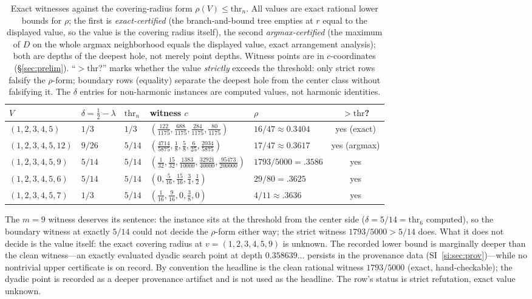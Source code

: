 \documentclass[11pt,a4paper]{article}
\numberwithin{equation}{section}
\theoremstyle{plain}
\theoremstyle{definition}
\theoremstyle{remark}
\begin{document}
\begin{table}[htbp]
\centering
\footnotesize
\caption{Exact witnesses against the covering-radius form
$\rho(V)\le\mathrm{thr}_n$. All values are exact rational lower bounds
for $\rho$; the first is \emph{exact-certified} (the branch-and-bound
tree empties at $r$ equal to the displayed value, so the value is the
covering radius itself), the second \emph{argmax-certified} (the
maximum of $D$ on the whole argmax neighborhood equals the displayed
value, exact arrangement analysis); both are depths of the deepest
hole, not merely point depths. Witness points are in $c$-coordinates
(\S\ref{sec:prelim}). ``$>\mathrm{thr}$?'' marks whether the value
\emph{strictly} exceeds the threshold: only strict rows falsify the
$\rho$-form; boundary rows (equality) separate the deepest hole from
the center class without falsifying it. The $\delta$ entries for
non-harmonic instances are computed values, not harmonic identities.}
\label{tab:refute}
\begin{tabularx}{\textwidth}{@{} l l l >{\raggedright\arraybackslash}X l c @{}}
\toprule
$V$ & $\delta=\tfrac12-\lambda$ & $\mathrm{thr}_n$ & witness $c$ &
$\rho$ & $>\mathrm{thr}$? \\
\midrule
$(1,2,3,4,5)$ & $1/3$ & $1/3$ &
$(\tfrac{122}{1175},\tfrac{688}{1175},\tfrac{284}{1175},
\tfrac{80}{1175})$ &
$16/47\approx0.3404$ & yes (exact) \\
$(1,2,3,4,5,12)$ & $9/26$ & $5/14$ &
$(\tfrac{4714}{5875},\tfrac18,\tfrac58,\tfrac6{25},
\tfrac{2034}{5875})$ &
$17/47\approx0.3617$ & yes (argmax) \\
$(1,2,3,4,5,9)$ & $5/14$ & $5/14$ &
$(\tfrac1{32},\tfrac{15}{32},\tfrac{1383}{10000},
\tfrac{32921}{40000},\tfrac{95473}{200000})$ &
$1793/5000=.3586$ & yes \\
$(1,2,3,4,5,6)$ & $5/14$ & $5/14$ &
$(0,\tfrac5{16},\tfrac{15}{16},\tfrac34,\tfrac12)$ & $29/80=.3625$ &
yes \\
$(1,2,3,4,5,7)$ & $1/3$ & $5/14$ &
$(\tfrac1{16},\tfrac9{16},0,\tfrac38,0)$ & $4/11{\approx}.3636$ & yes
\\
\bottomrule
\end{tabularx}
\end{table}

The $m=9$ witness deserves its sentence: the instance sits at the
threshold from the center side ($\delta=5/14=\mathrm{thr}_6$ computed),
so the boundary witness at exactly $5/14$ could not decide the
$\rho$-form either way; the strict witness $1793/5000>5/14$ does. What
it does not decide is the value itself: the exact covering radius at
$v=(1,2,3,4,5,9)$ is unknown. The recorded lower bound is marginally
deeper than the clean witness---an exactly evaluated dyadic search
point at depth $0.358639\ldots$ persists in the provenance data
(SI~\ref{si:sec:prov})---while no nontrivial upper certificate is
on record. By convention the headline is the clean rational witness
$1793/5000$ (exact, hand-checkable); the dyadic point is recorded as a
deeper provenance artifact and is not used as the headline. The row's
status is strict refutation, exact value unknown.
\end{document}

